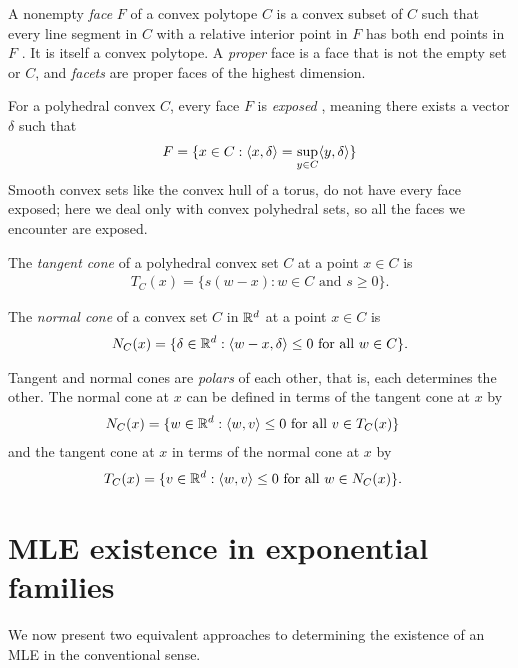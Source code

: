 A nonempty \emph{face} $F$ of a convex polytope $C$ is a convex subset of $C$ such that 
every line segment in $C$ with a relative interior point in $F$ has 
both end points in $F$ \citep{Rockafellar:1970}.  It is itself a convex polytope.
A \emph{proper} face is a face that is not the empty set or $C$, and 
\emph{facets} are proper faces of the highest dimension.

For a polyhedral convex $C$, every face $F$ is \emph{exposed} \citep{Rockafellar:1970}, 
meaning there exists a vector $\delta$ such that
\begin{align*}
	F = \{ x \in C: \langle x, \delta \rangle = \sup_{y \in C} \langle y,\delta \rangle  \}
\end{align*}
Smooth convex sets like the convex hull of a torus, do not have every face
exposed; here we deal only with convex polyhedral sets, so all the faces we
encounter are exposed.


The \emph{tangent cone} of a polyhedral convex set $C$ at a point $x \in C$ is
\begin{align*}
	T_C(x) = \{s(w-x):w \in C \text{ and } s \geq 0 \}.
\end{align*}


The \emph{normal cone} of a convex set $C$ in ${\mathbb R}^d$ at a point $x \in C$ is 
\begin{align*}
	N_C(x) = \{ \delta \in {\mathbb R}^d: \langle w-x,\delta \rangle \leq 0 \text{ for all } w \in C 
\}.
\end{align*}

Tangent and normal cones are \emph{polars} of each other, that is, each determines the other.  
The normal cone at $x$ can be defined in terms of the tangent cone at $x$ by
\begin{align*}
	N_C(x) 	&= \{ w \in {\mathbb R}^d: \langle  w, v  \rangle \leq 0 \text{ for all } v \in T_C(x) \} 
\end{align*}
and the tangent cone at $x$ in terms of the normal cone at $x$ by
\begin{align*}
	T_C(x) 	&= \{ v \in {\mathbb R}^d: \langle  w, v  \rangle \leq 0 \text{ for all } w \in N_C(x) \}.
\end{align*}




\section{MLE existence in exponential families} \label{S:MLE existence}
We now present two equivalent approaches to determining the existence of an MLE
in the conventional sense.  

